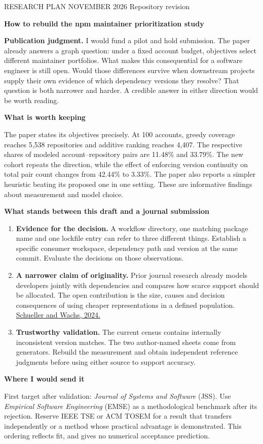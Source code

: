 \documentclass[11pt,a4paper]{article}
\newcommand{\hd}[1]{\par\textbf{\color{accent}#1}\par\nopagebreak}
\newcommand{\doi}[2]{\href{https://doi.org/#1}{#2}}
\newcommand{\code}[1]{\texttt{\detokenize{#1}}}
\begin{document}
{\small\color{muted}RESEARCH PLAN  NOVEMBER 2026 \quad Repository revision \code{eb62a6c0ee35}}\par
{\Huge\bfseries\color{ink}How to rebuild the npm maintainer prioritization study\par}
\medskip
\textbf{Publication judgment.} I would fund a pilot and hold submission. The paper already answers a graph question: under a fixed account budget, objectives select different maintainer portfolios. What makes this consequential for a software engineer is still open. Would those differences survive when downstream projects supply their own evidence of which dependency versions they resolve? That question is both narrower and harder. A credible answer in either direction would be worth reading.

\hd{What is worth keeping}
The paper states its objectives precisely. At 100 accounts, greedy coverage reaches 5,538 repositories and additive ranking reaches 4,407. The respective shares of modeled account--repository pairs are 11.48\% and 33.79\%. The new cohort repeats the direction, while the effect of enforcing version continuity on total pair count changes from 42.44\% to 3.33\%. The paper also reports a simpler heuristic beating its proposed one in one setting. These are informative findings about measurement and model choice.

\hd{What stands between this draft and a journal submission}
\begin{enumerate}
\item \textbf{Evidence for the decision.} A workflow directory, one matching package name and one lockfile entry can refer to three different things. Establish a specific consumer workspace, dependency path and version at the same commit. Evaluate the decisions on those observations.
\item \textbf{A narrower claim of originality.} Prior journal research already models developers jointly with dependencies and compares how scarce support should be allocated. The open contribution is the size, causes and decision consequences of using cheaper representations in a defined population. \doi{10.1177/26339137241231912}{Schueller and Wachs, 2024.}
\item \textbf{Trustworthy validation.} The current census contains internally inconsistent version matches. The two author-named sheets come from generators. Rebuild the measurement and obtain independent reference judgments before using either source to support accuracy.
\end{enumerate}
\hd{Where I would send it}
First target after validation: \textit{Journal of Systems and Software} (JSS). Use \textit{Empirical Software Engineering} (EMSE) as a methodological benchmark after its rejection. Reserve IEEE TSE or ACM TOSEM for a result that transfers independently or a method whose practical advantage is demonstrated. This ordering reflects fit, and gives no numerical acceptance prediction.
\smallskip
\end{document}

